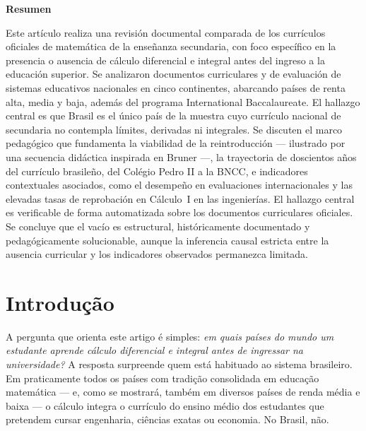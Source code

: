 \documentclass[12pt,a4paper,oneside]{article}
\begin{document}
{\centering\textbf{Resumen}\par}\vspace{2pt}
{\small\noindent
Este artículo realiza una revisión documental comparada de los
currículos oficiales de matemática de la enseñanza secundaria, con foco
específico en la presencia o ausencia de cálculo diferencial e integral
antes del ingreso a la educación superior. Se analizaron documentos
curriculares y de evaluación de sistemas educativos nacionales en cinco
continentes, abarcando países de renta alta, media y baja, además del
programa International Baccalaureate. El hallazgo central es que Brasil
es el único país de la muestra cuyo currículo nacional de secundaria no
contempla límites, derivadas ni integrales. Se discuten el marco
pedagógico que fundamenta la viabilidad de la reintroducción --- ilustrado
por una secuencia didáctica inspirada en Bruner ---, la
trayectoria de doscientos años del currículo
brasileño, del Colégio Pedro II a la BNCC, e indicadores contextuales
asociados, como el desempeño en evaluaciones internacionales y las
elevadas tasas de reprobación en Cálculo~I en las ingenierías. El hallazgo
central es verificable de forma automatizada sobre los documentos
curriculares oficiales. Se
concluye que el vacío es estructural, históricamente documentado y
pedagógicamente solucionable, aunque la inferencia causal estricta
entre la ausencia curricular y los indicadores observados permanezca
limitada.\par}

\smallskip
{}

\bigskip

\section{Introdução}

A pergunta que orienta este artigo é simples: \emph{em quais países do
mundo um estudante aprende cálculo diferencial e integral antes de
ingressar na universidade?} A resposta surpreende quem está habituado ao
sistema brasileiro. Em praticamente todos os países com tradição
consolidada em educação matemática --- e, como se mostrará, também em
diversos países de renda média e baixa --- o cálculo integra o currículo
do ensino médio dos estudantes que pretendem cursar engenharia, ciências
exatas ou economia. No Brasil, não.
\end{document}
